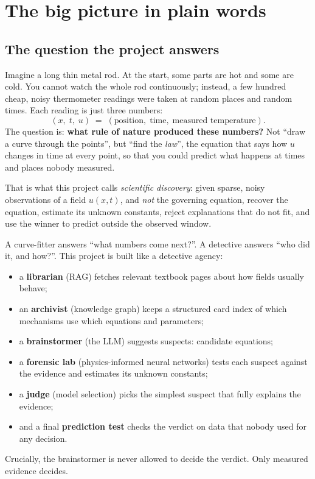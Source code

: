 \section{The big picture in plain words}

\subsection{The question the project answers}

Imagine a long thin metal rod. At the start, some parts are hot and some are cold. You cannot watch the whole
rod continuously; instead, a few hundred cheap, noisy thermometer readings were taken at random places and
random times. Each reading is just three numbers:
\[
  (x,\; t,\; u) \;=\; (\text{position},\; \text{time},\; \text{measured temperature}).
\]
The question is: \textbf{what rule of nature produced these numbers?} Not ``draw a curve through the points'',
but ``find the \emph{law}'', the equation that says how $u$ changes in time at every point, so that you could
predict what happens at times and places nobody measured.

That is what this project calls \emph{scientific discovery}: given sparse, noisy observations of a field
$u(x,t)$, and \emph{not} the governing equation, recover the equation, estimate its unknown constants, reject
explanations that do not fit, and use the winner to predict outside the observed window.

\begin{intuition}
A curve-fitter answers ``what numbers come next?''. A detective answers ``who did it, and how?''. This project
is built like a detective agency:
\begin{itemize}
  \item a \textbf{librarian} (RAG) fetches relevant textbook pages about how fields usually behave;
  \item an \textbf{archivist} (knowledge graph) keeps a structured card index of which mechanisms use which
        equations and parameters;
  \item a \textbf{brainstormer} (the LLM) suggests suspects: candidate equations;
  \item a \textbf{forensic lab} (physics-informed neural networks) tests each suspect against the evidence and
        estimates its unknown constants;
  \item a \textbf{judge} (model selection) picks the simplest suspect that fully explains the evidence;
  \item and a final \textbf{prediction test} checks the verdict on data that nobody used for any decision.
\end{itemize}
Crucially, the brainstormer is never allowed to decide the verdict. Only measured evidence decides.
\end{intuition}

